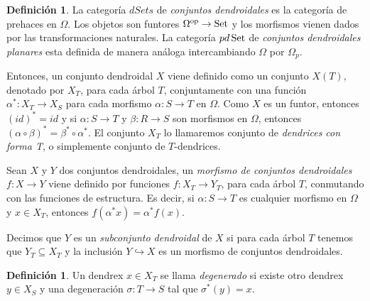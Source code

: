 \documentclass[11pt,a4paper,openright,oneside]{article}
\numberwithin{equation}{section}
\theoremstyle{definition}
\newtheorem{defi}[teo]{Definici\'on}
\newcommand{\Set}{\mathop{\rm Set}}
\begin{document}
\begin{defi}
    La categor\'ia $dSets$ de \emph{conjuntos dendroidales} es la categor\'ia de prehaces en $\Omega$. Los objetos son funtores $\Omega^{\rm op}\to\Set$ y los morfismos vienen dados por las transformaciones naturales. La categor\'ia $pd\Set$ de \emph{conjuntos dendroidales planares} esta definida de manera an\'aloga intercambiando $\Omega$ por $\Omega_p$.

    Entonces, un conjunto dendroidal $X$ viene definido como un conjunto $X(T)$, denotado por $X_T$, para cada \'arbol $T$, conjuntamente con una funci\'on $\alpha^{*}\colon X_T \to X_S$ para cada morfismo $\alpha\colon S\to T$ en $\Omega$. Como $X$ es un funtor, entonces $(id)^{*}=id$ y si $\alpha\colon S\to T$ y $\beta\colon R\to S$ son morfismos en $\Omega$, entonces $(\alpha\circ\beta)^{*}=\beta^{*}\circ\alpha^{*}$. El conjunto $X_T$ lo llamaremos conjunto de \emph{dendrices con forma T}, o simplemente conjunto de $T$-dendrices.

    Sean $X$ y $Y$ dos conjuntos dendroidales, un \emph{morfismo de conjuntos dendroidales} $f\colon X \to Y$ viene definido por funciones $f\colon X_T\to Y_T$, para cada \'arbol $T$, conmutando con las funciones de estructura. Es decir, si $\alpha\colon S\to T$ es cualquier morfismo en $\Omega$ y $x\in X_T$, entonces $f(\alpha^{*}x)=\alpha^{*}f(x)$.

    Decimos que $Y$ es un \emph{subconjunto dendroidal} de $X$ si para cada \'arbol $T$ tenemos que $Y_T\subseteq X_T$ y la inclusi\'on $Y \hookrightarrow X$ es un morfismo de conjuntos dendroidales.
\end{defi}
\begin{defi}
    Un dendrex $x\in X_T$ se llama \emph{degenerado} si existe otro dendrex $y\in X_S$ y una degeneraci\'on $\sigma\colon T\to S$ tal que $\sigma^{*}(y)=x$.
\end{defi}
\end{document}
